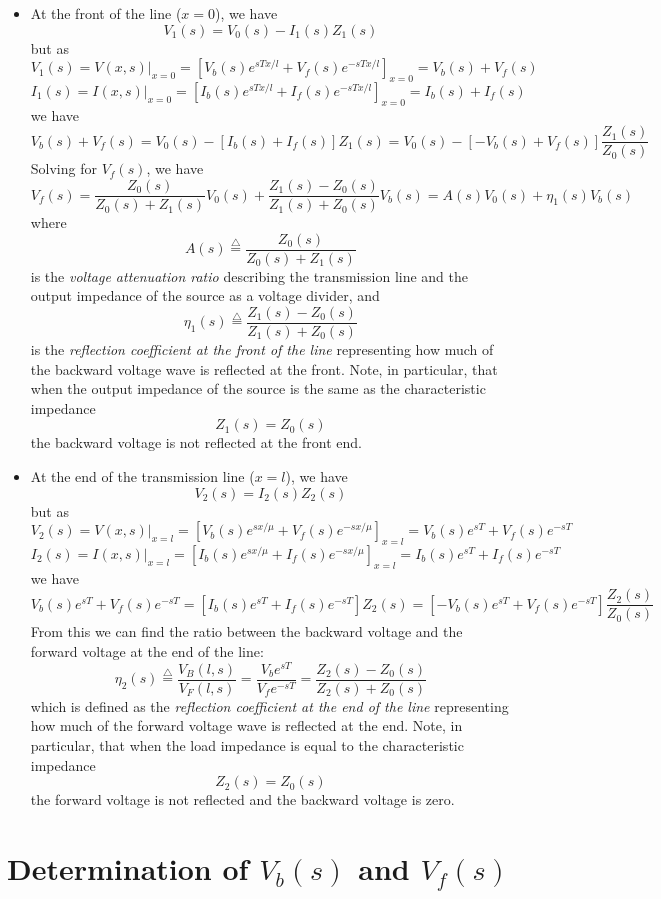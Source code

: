 \begin{itemize}
\item At the front of the line ($x=0$), we have
\[	V_1(s)=V_0(s)-I_1(s)Z_1(s)	\]
but as
\[ V_1(s)=V(x,s)|_{x=0}=[V_b(s)e^{sTx/l}+V_f(s)e^{-sTx/l}]_{x=0}
	=V_b(s)+V_f(s)	\]
\[ I_1(s)=I(x,s)|_{x=0}=[I_b(s)e^{sTx/l}+I_f(s)e^{-sTx/l}]_{x=0}
	=I_b(s)+I_f(s)	\]
we have
\[ V_b(s)+V_f(s)=V_0(s)-[I_b(s)+I_f(s)]Z_1(s)
	=V_0(s)-[-V_b(s)+V_f(s)]\frac{Z_1(s)}{Z_0(s)}	\]
Solving for $V_f(s)$, we have
\[
V_f(s)=\frac{Z_0(s)}{Z_0(s)+Z_1(s)}V_0(s)+\frac{Z_1(s)-Z_0(s)}{Z_1(s)+Z_0(s)}V_b(s)
=A(s)V_0(s)+\eta_1(s)V_b(s)	\]
where
\[	A(s)\stackrel{\triangle}{=}\frac{Z_0(s)}{Z_0(s)+Z_1(s)}	\]
is the {\em voltage attenuation ratio} describing the transmission 
line and the output impedance of the source as a voltage divider, and
\[ \eta_1(s)\stackrel{\triangle}{=}\frac{Z_1(s)-Z_0(s)}{Z_1(s)+Z_0(s)} \]
is the {\em reflection coefficient at the front of the line}
representing how much of the backward voltage wave is reflected at
the front. Note, in particular, that when the output impedance of the
source is the same as the characteristic impedance
\[	Z_1(s)=Z_0(s)	\]
the backward voltage is not reflected at the front end.

\item At the end of the transmission line ($x=l$), we have
\[	V_2(s)=I_2(s)Z_2(s)	\]
but as
\[ V_2(s)=V(x,s)|_{x=l}=[V_b(s)e^{sx/\mu}+V_f(s)e^{-sx/\mu}]_{x=l}
	=V_b(s)e^{sT}+V_f(s)e^{-sT}	\]
\[ I_2(s)=I(x,s)|_{x=l}=[I_b(s)e^{sx/\mu}+I_f(s)e^{-sx/\mu}]_{x=l}
	=I_b(s)e^{sT}+I_f(s)e^{-sT}	\]
we have
\[ V_b(s)e^{sT}+V_f(s)e^{-sT}=[I_b(s)e^{sT}+I_f(s)e^{-sT}]Z_2(s)
   =[-V_b(s)e^{sT}+V_f(s)e^{-sT}]\frac{Z_2(s)}{Z_0(s)} \]
From this we can find the ratio between the backward voltage and
the forward voltage at the end of the line:
\[	\eta_2(s)\stackrel{\triangle}{=}\frac{V_B(l,s)}{V_F(l,s)}
	=\frac{V_be^{sT}}{V_fe^{-sT}}
	=\frac{Z_2(s)-Z_0(s)}{Z_2(s)+Z_0(s)}		\]
which is defined as the {\em reflection coefficient at the end of the line}
representing how much of the forward voltage wave is reflected at the 
end. Note, in particular, that when the load impedance is equal to the 
characteristic impedance
\[	Z_2(s)=Z_0(s)	\]
the forward voltage is not reflected and the backward voltage is zero.
\end{itemize}

\newpage
\section*{Determination of $V_b(s)$ and $V_f(s)$}

